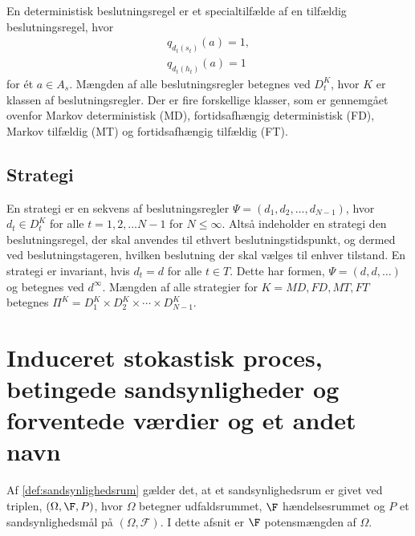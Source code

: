 En deterministisk beslutningsregel er et specialtilfælde af en tilfældig beslutningsregel, hvor 
\begin{align*}
    q_{d_t(s_t)}(a)=1,\\
    q_{d_t(h_t)}(a)=1
\end{align*}
for ét $a\in A_s$. Mængden af alle beslutningsregler betegnes ved $D_t^K$, hvor $K$ er klassen af beslutningsregler. Der er fire forskellige klasser, som er gennemgået ovenfor Markov deterministisk (MD), fortidsafhængig deterministisk (FD), Markov tilfældig (MT) og fortidsafhængig tilfældig (FT). 

\subsection{Strategi}
En strategi er en sekvens af beslutningsregler $\Psi=(d_1,d_2,\dots,d_{N-1})$, hvor $d_t\in D_t^K$ for alle $t=1, 2, \dots N-1$ for $N \leq \infty$. Altså indeholder en strategi den beslutningsregel, der skal anvendes til ethvert beslutningstidspunkt, og dermed ved beslutningstageren, hvilken beslutning der skal vælges til enhver tilstand. En strategi er invariant, hvis $d_t=d$ for alle $t\in T$. Dette har formen, $\Psi=(d,d,\dots)$ og betegnes ved $d^\infty$. 
Mængden af alle strategier for $K=MD, FD, MT, FT$ betegnes $\Pi^K=D_1^K\times D_2^K\times \cdots\times D_{N-1}^K$.



\section{Induceret stokastisk proces, betingede sandsynligheder og forventede værdier og et andet navn}

Af \autoref{def:sandsynlighedsrum} gælder det, at et sandsynlighedsrum er givet ved triplen, $(\Omega, \F, P)$, hvor $\Omega$ betegner udfaldsrummet, $\F$ hændelsesrummet og $P$ et sandsynlighedsmål på $(\Omega,\mathcal{F})$. I dette afsnit er $\F$ potensmængden af $\Omega$.

